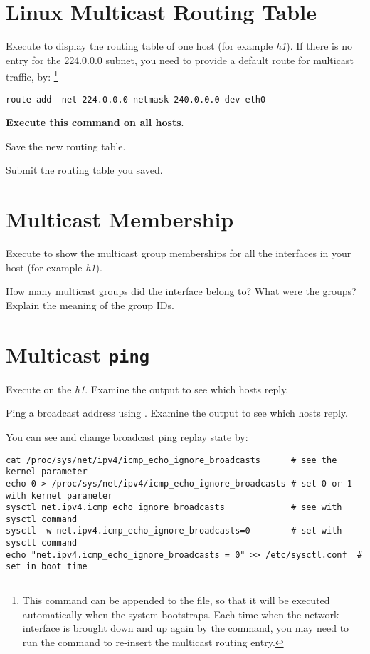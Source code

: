 \documentclass{../UTNetLab}
\begin{document}
\section{Linux Multicast Routing Table}
\label{sec:linux-multicast-routing}
Execute  to display the routing table of one host (for example \textit{h1}).
If there is no entry for the 224.0.0.0 subnet, you need to provide a default route for multicast traffic, by:
\footnote{This command can be appended to the  file, so that it will be executed automatically when the system bootstraps.
    Each time when the network interface is brought down and up again by the  command, you may need to run the  command to re-insert the multicast routing entry.}
\begin{lstlisting}[emph=eth0,morekeywords={[3]add,netmask,dev}]
route add -net 224.0.0.0 netmask 240.0.0.0 dev eth0
    \end{lstlisting}
\textbf{Execute this command on all hosts}.

Save the new routing table.

\begin{report}
    \item Submit the routing table you saved.
\end{report}

\section{Multicast Membership}
Execute  to show the multicast group memberships for all the interfaces in your host (for example \textit{h1}).

\begin{report}
    \item How many multicast groups did the interface belong to? What were the groups? Explain the meaning of the group IDs.
\end{report}

\section{Multicast \texttt{ping}}
Execute  on the \textit{h1}.
Examine the  output to see which hosts reply.

Ping a broadcast address using .
Examine the  output to see which hosts reply.

You can see and change broadcast ping replay state by:
\begin{lstlisting}[emph=eth0]
cat /proc/sys/net/ipv4/icmp_echo_ignore_broadcasts      # see the kernel parameter
echo 0 > /proc/sys/net/ipv4/icmp_echo_ignore_broadcasts # set 0 or 1 with kernel parameter
sysctl net.ipv4.icmp_echo_ignore_broadcasts             # see with sysctl command
sysctl -w net.ipv4.icmp_echo_ignore_broadcasts=0        # set with sysctl command
echo "net.ipv4.icmp_echo_ignore_broadcasts = 0" >> /etc/sysctl.conf  # set in boot time
    \end{lstlisting}
\end{document}
